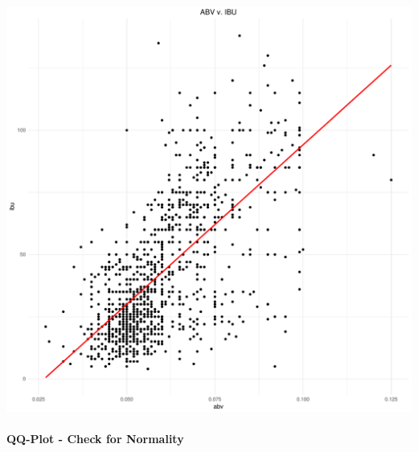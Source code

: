 \documentclass[]{article}
\let\oldparagraph\paragraph
\renewcommand{\paragraph}[1]{\oldparagraph{#1}\mbox{}}
\begin{document}
\begin{center}\includegraphics{Analysis_Final_files/figure-latex/unnamed-chunk-22-1} \end{center}

\paragraph{QQ-Plot - Check for
Normality}\label{qq-plot---check-for-normality}
\end{document}
